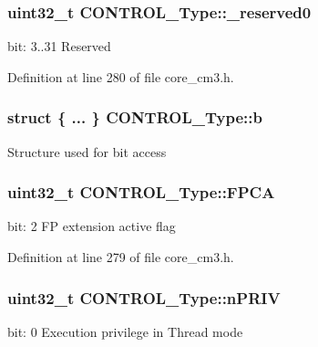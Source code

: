 \subsubsection[{\texorpdfstring{\+\_\+reserved0}{_reserved0}}]{\setlength{\rightskip}{0pt plus 5cm}uint32\+\_\+t C\+O\+N\+T\+R\+O\+L\+\_\+\+Type\+::\+\_\+reserved0}\hypertarget{unionCONTROL__Type_af8c314273a1e4970a5671bd7f8184f50}{}\label{unionCONTROL__Type_af8c314273a1e4970a5671bd7f8184f50}
bit\+: 3..31 Reserved 

Definition at line 280 of file core\+\_\+cm3.\+h.

\subsubsection[{\texorpdfstring{b}{b}}]{\setlength{\rightskip}{0pt plus 5cm}struct \{ ... \}   C\+O\+N\+T\+R\+O\+L\+\_\+\+Type\+::b}\hypertarget{unionCONTROL__Type_adc6a38ab2980d0e9577b5a871da14eb9}{}\label{unionCONTROL__Type_adc6a38ab2980d0e9577b5a871da14eb9}
Structure used for bit access 
\subsubsection[{\texorpdfstring{F\+P\+CA}{FPCA}}]{\setlength{\rightskip}{0pt plus 5cm}uint32\+\_\+t C\+O\+N\+T\+R\+O\+L\+\_\+\+Type\+::\+F\+P\+CA}\hypertarget{unionCONTROL__Type_ac62cfff08e6f055e0101785bad7094cd}{}\label{unionCONTROL__Type_ac62cfff08e6f055e0101785bad7094cd}
bit\+: 2 FP extension active flag 

Definition at line 279 of file core\+\_\+cm3.\+h.

\subsubsection[{\texorpdfstring{n\+P\+R\+IV}{nPRIV}}]{\setlength{\rightskip}{0pt plus 5cm}uint32\+\_\+t C\+O\+N\+T\+R\+O\+L\+\_\+\+Type\+::n\+P\+R\+IV}\hypertarget{unionCONTROL__Type_a35c1732cf153b7b5c4bd321cf1de9605}{}\label{unionCONTROL__Type_a35c1732cf153b7b5c4bd321cf1de9605}
bit\+: 0 Execution privilege in Thread mode 

